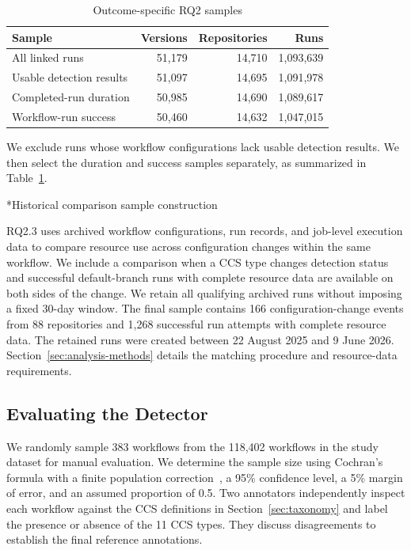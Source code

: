 \documentclass[smallextended]{svjour3}
\makeatletter
\newcommand{\datastepheading}{%
  \@startsection{paragraph}{4}{\z@}{-8pt}{3pt}%
    {\normalfont\normalsize\bfseries}*}
\makeatother
\begin{document}
\begin{table}[htbp]
\centering\small
\caption{Outcome-specific RQ2 samples}
\label{tab:rq2-screening-flow}
\begin{tabular}{lrrr}
\hline
\textbf{Sample} & \textbf{Versions} & \textbf{Repositories} & \textbf{Runs} \\
\hline
All linked runs & 51,179 & 14,710 & 1,093,639 \\
Usable detection results & 51,097 & 14,695 & 1,091,978 \\
Completed-run duration & 50,985 & 14,690 & 1,089,617 \\
Workflow-run success & 50,460 & 14,632 & 1,047,015 \\
\hline
\end{tabular}
\end{table}

We exclude runs whose workflow configurations lack usable detection results. We then select the duration and success samples separately, as summarized in Table~\ref{tab:rq2-screening-flow}.

\datastepheading{Historical comparison sample construction}

RQ2.3 uses archived workflow configurations, run records, and job-level execution data to compare resource use across configuration changes within the same workflow. We include a comparison when a CCS type changes detection status and successful default-branch runs with complete resource data are available on both sides of the change. We retain all qualifying archived runs without imposing a fixed 30-day window. The final sample contains 166 configuration-change events from 88 repositories and 1,268 successful run attempts with complete resource data. The retained runs were created between 22 August 2025 and 9 June 2026. Section~\ref{sec:analysis-methods} details the matching procedure and resource-data requirements.

\subsection{Evaluating the Detector}
\label{sec:validation-design}

We randomly sample 383 workflows from the 118,402 workflows in the study dataset for manual evaluation. We determine the sample size using Cochran's formula with a finite population correction~\citep{cochran1977sampling}, a 95\% confidence level, a 5\% margin of error, and an assumed proportion of 0.5. Two annotators independently inspect each workflow against the CCS definitions in Section~\ref{sec:taxonomy} and label the presence or absence of the 11 CCS types. They discuss disagreements to establish the final reference annotations.
\end{document}
